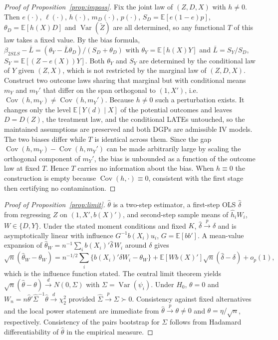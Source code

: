 \documentclass[11pt]{article}
\theoremstyle{plain}
\theoremstyle{definition}
\newcommand{\E}{\mathbb{E}}
\newcommand{\Cov}{\operatorname{Cov}}
\newcommand{\Var}{\operatorname{Var}}
\newcommand{\Lb}{\bar{L}}
\newcommand{\Zt}{\tilde{Z}}
\begin{document}
\begin{proof}[Proof of Proposition~\ref{prop:imposs}]
Fix the joint law of $(Z,D,X)$ with $h\neq 0$. Then $e(\cdot)$, $\ell(\cdot)$, $h(\cdot)$, $m_D(\cdot)$, $p(\cdot)$, $S_D=\E[e(1-e)p]$, $\theta_D=\E[h(X)D]$ and $\Var(\Zt)$ are all determined, so any functional $T$ of this law takes a fixed value. By the bias formula, $\beta_{2SLS}-\Lb=(\theta_Y-\Lb\theta_D)/(S_D+\theta_D)$ with $\theta_Y=\E[h(X)Y]$ and $\Lb=S_Y/S_D$, $S_Y=\E[(Z-e(X))Y]$. Both $\theta_Y$ and $S_Y$ are determined by the conditional law of $Y$ given $(Z,X)$, which is not restricted by the marginal law of $(Z,D,X)$. Construct two outcome laws sharing that marginal but with conditional means $m_Y$ and $m_Y'$ that differ on the span orthogonal to $(1,X')$, i.e.\ $\Cov(h,m_Y)\neq\Cov(h,m_Y')$. Because $h\neq 0$ such a perturbation exists. It changes only the level $\E[Y(d)\mid X]$ of the potential outcomes and leaves $D=D(Z)$, the treatment law, and the conditional LATEs untouched, so the maintained assumptions are preserved and both DGPs are admissible IV models. The two biases differ while $T$ is identical across them. Since the gap $\Cov(h,m_Y)-\Cov(h,m_Y')$ can be made arbitrarily large by scaling the orthogonal component of $m_Y'$, the bias is unbounded as a function of the outcome law at fixed $T$. Hence $T$ carries no information about the bias. When $h\equiv 0$ the construction is empty because $\Cov(h,\cdot)\equiv 0$, consistent with the first stage then certifying no contamination.
\end{proof}

\begin{proof}[Proof of Proposition~\ref{prop:limit}]
$\hat\theta$ is a two-step estimator, a first-step OLS $\hat\delta$ from regressing $Z$ on $(1,X',b(X)')$, and second-step sample means of $\hat h_i W_i$, $W\in\{D,Y\}$. Under the stated moment conditions and fixed $K$, $\hat\delta\xrightarrow{p}\delta$ and is asymptotically linear with influence $G^{-1}b(X_i)u_i$, $G=\E[bb']$. A mean-value expansion of $\hat\theta_W=n^{-1}\sum_i b(X_i)'\hat\delta\,W_i$ around $\delta$ gives
\[
\sqrt{n}(\hat\theta_W-\theta_W)=n^{-1/2}\sum_i\{b(X_i)'\delta W_i-\theta_W\}+\E[Wb(X)']\sqrt{n}(\hat\delta-\delta)+o_p(1),
\]
which is the influence function stated. The central limit theorem yields $\sqrt{n}(\hat\theta-\theta)\xrightarrow{d}N(0,\Sigma)$ with $\Sigma=\Var(\psi_i)$. Under $H_0$, $\theta=0$ and $W_n=n\hat\theta'\hat\Sigma^{-1}\hat\theta\xrightarrow{d}\chi^2_2$ provided $\hat\Sigma\xrightarrow{p}\Sigma\succ 0$. Consistency against fixed alternatives and the local power statement are immediate from $\hat\theta\xrightarrow{p}\theta\neq 0$ and $\theta=\eta/\sqrt{n}$, respectively. Consistency of the pairs bootstrap for $\Sigma$ follows from Hadamard differentiability of $\hat\theta$ in the empirical measure.
\end{proof}
\end{document}
